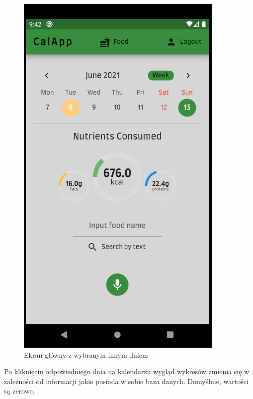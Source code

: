 \documentclass[12pt, a4paper]{article}
\begin{document}
\begin{sloppypar}
{{    \begin{figure}[H]
      \centering
      \includegraphics[scale=0.9]{screen_home_diff_day.PNG}
      \caption{Ekran główny z wybranym innym dniem}
      \label{fig:screen_home_diff_day}
    \end{figure}

    Po kliknięciu odpowiedniego dnia na kalendarzu wygląd wykresów zmienia się w zależności
    od informacji jakie posiada w sobie baza danych. Domyślnie, wartości są zerowe.

}}
\end{sloppypar}
\end{document}
